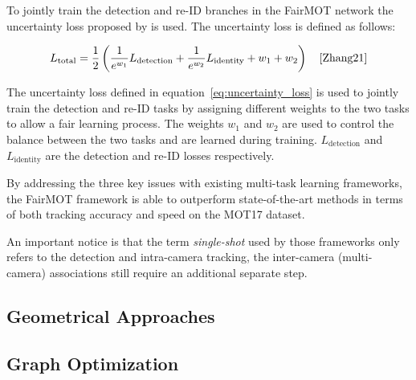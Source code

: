 To jointly train the detection and re-ID branches in the FairMOT network the uncertainty loss proposed by \textcite{Cipolla18} is used. The uncertainty loss is defined as follows:

\begin{equation}
    \label{eq:uncertainty_loss}
    L_{\text{total}}=\frac{1}{2}\left(\frac{1}{e^{w_1}} L_{\text{detection}}+\frac{1}{e^{w_2}} L_{\text{identity}}+w_1+w_2\right)
    \quad\text{\cite[Eq.~5]{Zhang21}}
\end{equation}

The uncertainty loss defined in equation~\ref{eq:uncertainty_loss} is used to jointly train the detection and re-ID tasks by assigning different weights to the two tasks to allow a fair learning process. The weights \(w_1\) and \(w_2\) are used to control the balance between the two tasks and are learned during training. \(L_{\text{detection}}\) and \(L_{\text{identity}}\) are the detection and re-ID losses respectively.

By addressing the three key issues with existing multi-task learning frameworks, the FairMOT framework is able to outperform state-of-the-art methods in terms of both tracking accuracy and speed on the MOT17 dataset.

An important notice is that the term \textit{single-shot} used by those frameworks only refers to the detection and intra-camera tracking, the inter-camera (multi-camera) associations still require an additional separate step.

\subsection{Geometrical Approaches}\label{subsec:geometrical_approaches}


\subsection{Graph Optimization}\label{subsec:graph_optimization}


